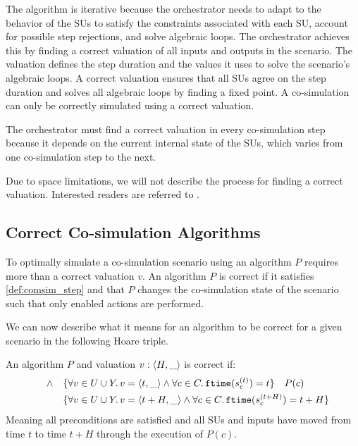 The algorithm is iterative because the orchestrator needs to adapt to the behavior of the SUs to satisfy the constraints associated with each SU, account for possible step rejections, and solve algebraic loops. 
The orchestrator achieves this by finding a correct valuation of all inputs and outputs in the scenario.
The valuation defines the step duration and the values it uses to solve the scenario's algebraic loops. 
A correct valuation ensures that all SUs agree on the step duration and solves all algebraic loops by finding a fixed point.
A co-simulation can only be correctly simulated using a correct valuation.

The orchestrator must find a correct valuation in every co-simulation step because it depends on the current internal state of the SUs, which varies from one co-simulation step to the next.

Due to space limitations, we will not describe the process for finding a correct valuation. 
Interested readers are referred to \cite{thrane2021}.

\subsection{Correct Co-simulation Algorithms}\label{sec:correctcosim}
To optimally simulate a co-simulation scenario using an algorithm $P$ requires more than a correct valuation $v$. 
An algorithm $P$ is correct if it satisfies \cref{def:comsim_step} and that $P$ changes the co-simulation state of the scenario such that only enabled actions are performed.

We can now describe what it means for an algorithm to be correct for a given scenario in the following Hoare triple.

\begin{definition}\label{def:correctalgo}
  An algorithm $P$ and valuation $v:  \left\langle H, \_ \right\rangle $ is correct if:
  \begin{align*}
     \quad \land \quad
     &\{\forall v \in U \cup Y \ldotp v =  \left\langle t, \_ \right\rangle  \land \forall c \in C \ldotp \mathtt{ftime}(s_{c}^{(t)}) = t\} \quad P(c) \\
     & \{\forall v \in U \cup Y \ldotp v =  \left\langle t+H, \_ \right\rangle  \land \forall c \in C \ldotp \mathtt{ftime}(s_{c}^{(t+H)}) = t+H \}
  \end{align*}
  Meaning all preconditions are satisfied and all SUs and inputs have moved from time $t$ to time $t+H$ through the execution of $P(c)$.
\end{definition}

